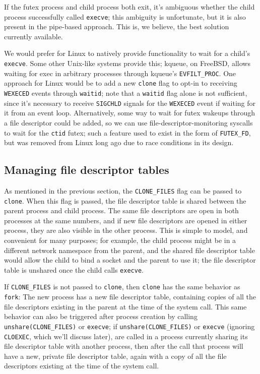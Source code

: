 \documentclass{acmart}
\begin{document}
If the futex process and child process both exit,
it's ambiguous whether the child process successfully called \texttt{execve};
this ambiguity is unfortunate, but it is also present in the pipe-based approach.
This is, we believe, the best solution currently available.

We would prefer for Linux to natively provide functionality to wait for a child's \texttt{execve}.
Some other Unix-like systems provide this;
kqueue, on FreeBSD, allows waiting for exec in arbitrary processes through kqueue's \verb|EVFILT_PROC|.
One approach for Linux would be to add a new \texttt{clone} flag to opt-in to receiving \texttt{WEXECED} events through \texttt{waitid};
note that a \texttt{waitid} flag alone is not sufficient,
since it's necessary to receive \texttt{SIGCHLD} signals for the \texttt{WEXECED} event if waiting for it from an event loop.
Alternatively, some way to wait for futex wakeups through a file descriptor could be added,
so we can use file-descriptor-monitoring syscalls to wait for the \texttt{ctid} futex;
such a feature used to exist in the form of \verb|FUTEX_FD|,
but was removed from Linux long ago due to race conditions in its design.
\subsection{Managing file descriptor tables}\label{fdtables}
As mentioned in the previous section,
the \verb|CLONE_FILES| flag can be passed to \texttt{clone}.
When this flag is passed,
the file descriptor table is shared between the parent process and child process.
The same file descriptors are open in both processes at the same numbers,
and if new file descriptors are opened in either process,
they are also visible in the other process.
This is simple to model,
and convenient for many purposes;
for example, the child process might be in a different network namespace from the parent,
and the shared file descriptor table would allow the child to bind a socket
and the parent to use it;
the file descriptor table is unshared once the child calls \texttt{execve}.

If \verb|CLONE_FILES| is not passed to \texttt{clone},
then \texttt{clone} has the same behavior as \texttt{fork}:
The new process has a new file descriptor table,
containing copies of all the file descriptors existing in the parent at the time of the system call.
This same behavior can also be triggered after process creation by calling \verb|unshare(CLONE_FILES)| or \texttt{execve};
if \verb|unshare(CLONE_FILES)| or \texttt{execve} (ignoring \texttt{CLOEXEC}, which we'll discuss later),
are called in a process currently sharing its file descriptor table with another process,
then after the call that process will have a new, private file descriptor table,
again with a copy of all the file descriptors existing at the time of the system call.
\end{document}
